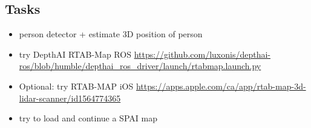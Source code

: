 \documentclass{article}
\begin{document}
\subsection{Tasks}
\begin{itemize}
\item person detector + estimate 3D position of person 
\item try DepthAI RTAB-Map ROS \url{https://github.com/luxonis/depthai-ros/blob/humble/depthai_ros_driver/launch/rtabmap.launch.py} 
\item Optional: try RTAB-MAP iOS \url{https://apps.apple.com/ca/app/rtab-map-3d-lidar-scanner/id1564774365} 
\item try to load and continue a SPAI map 
\end{itemize}
\end{document}
